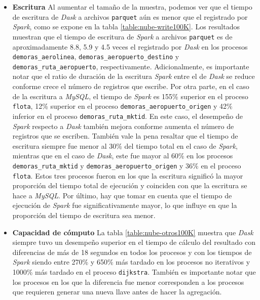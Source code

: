 \begin{itemize}
	\item \textbf{Escritura} Al aumentar el tamaño de la muestra, podemos ver que el tiempo de escritura de \textit{Dask} a archivos \texttt{parquet} aún es menor que el registrado por \textit{Spark}, como se expone en la tabla \ref{table:nube-write100K}. Los resultados muestran que el tiempo de escritura de \textit{Spark} a archivos \texttt{parquet} es de aproximadamente 8.8, 5.9 y 4.5 veces el registrado por \textit{Dask} en los procesos \texttt{demoras\_aerolinea}, \texttt{demoras\_aeropuerto\_destino} y \texttt{demoras\_ruta\_aeropuerto}, respectivamente. Adicionalmente, es importante notar que el ratio de duración de la escritura \textit{Spark} entre el de \textit{Dask} se reduce conforme crece el número de registros que escribe. Por otra parte, en el caso de la escritura a \textit{MySQL}, el tiempo de \textit{Spark} es 155\% superior en el proceso \texttt{flota}, 12\% superior en el proceso \texttt{demoras\_aeropuerto\_origen} y 42\% inferior en el proceso \texttt{demoras\_ruta\_mktid}. En este caso, el desempeño de \textit{Spark} respecto a \textit{Dask} también mejora conforme aumenta el número de registros que se escriben. También vale la pena resaltar que el tiempo de escritura siempre fue menor al 30\% del tiempo total en el caso de \textit{Spark}, mientras que en el caso de \textit{Dask}, este fue mayor al 60\% en los procesos \texttt{demoras\_ruta\_mktid} y \texttt{demoras\_aeropuerto\_origen} y 36\% en el proceso \texttt{flota}. Estos tres procesos fueron en los que la escritura significó la mayor proporción del tiempo total de ejecución y coinciden con que la escritura se hace a \textit{MySQL}. Por último, hay que tomar en cuenta que el tiempo de ejecución de \textit{Spark} fue significativamente mayor, lo que influye en que la proporción del tiempo de escritura sea menor.
	
	\item \textbf{Capacidad de cómputo} La tabla \ref{table:nube-otros100K} muestra que \textit{Dask} siempre tuvo un desempeño superior en el tiempo de cálculo del resultado con diferencias de más de 18 segundos en todos los procesos y con los tiempos de \textit{Spark} siendo entre 270\% y 650\% más tardado en los procesos no iterativos y 1000\% más tardado en el proceso \texttt{dijkstra}. También es importante notar que los procesos en los que la diferencia fue menor corresponden a los procesos que requieren generar una nueva llave antes de hacer la agregación.
	

\end{itemize}
